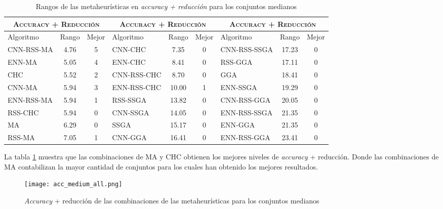 \begin{table}[h!]
\centering
\begin{adjustbox}{max width =\textwidth}
\begin{tabular}{l c c|l c c|l c c}
\hline
\multicolumn{3}{c|}{\textsc{Accuracy + Reducción}}
	& \multicolumn{3}{c}{\textsc{Accuracy + Reducción}}
	& \multicolumn{3}{c}{\textsc{Accuracy + Reducción}}\\
\hline
Algoritmo & Rango & Mejor & Algoritmo & Rango & Mejor & Algoritmo & Rango & Mejor \\
\hline
\hline

CNN-RSS-MA   & 4.76  & 5 & CNN-CHC      & 7.35  & 0 & CNN-RSS-SSGA & 17.23 & 0 \\
ENN-MA       & 5.05  & 4 & ENN-CHC      & 8.41  & 0 & RSS-GGA      & 17.11 & 0 \\
CHC          & 5.52  & 2 & CNN-RSS-CHC  & 8.70  & 0 & GGA          & 18.41 & 0 \\
CNN-MA       & 5.94  & 3 & ENN-RSS-CHC  & 10.00 & 1 & ENN-SSGA     & 19.29 & 0 \\
ENN-RSS-MA   & 5.94  & 1 & RSS-SSGA     & 13.82 & 0 & CNN-RSS-GGA  & 20.05 & 0 \\
RSS-CHC      & 5.94  & 0 & CNN-SSGA     & 14.05 & 0 & ENN-RSS-SSGA & 21.35 & 0 \\
MA           & 6.29  & 0 & SSGA         & 15.17 & 0 & ENN-GGA      & 21.35 & 0 \\
RSS-MA       & 7.05  & 1 & CNN-GGA      & 16.41 & 0 & ENN-RSS-GGA  & 23.41 & 0 \\

\hline
\end{tabular}
\end{adjustbox}
\caption{Rangos de las metaheurísticas en \emph{accuracy + reducción} para los conjuntos medianos}
\label{rank-med}
\end{table}

La tabla \ref{rank-med} muestra que las combinaciones de MA y CHC obtienen los mejores niveles de \emph{accuracy} + reducción. Donde las combinaciones de MA contabilizan la mayor cantidad de conjuntos para los cuales han obtenido los mejores resultados.

\begin{figure}[h!]

	\centering
	\texttt{[image: acc\_medium\_all.png]}

\caption{\emph{Accuracy} + reducción de las combinaciones de las metaheurísticas para los conjuntos medianos}
\label{medium-accu-all}
\end{figure}

